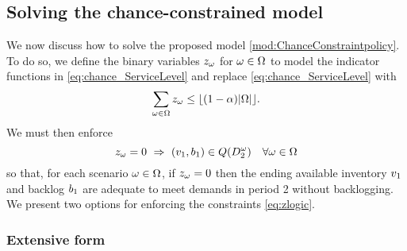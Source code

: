 \documentclass[msom]{oo}
\begin{document}
 
  
  \subsection{Solving the chance-constrained model}
  \label{ss:bnc}
  
  We now discuss how to solve the proposed model \eqref{mod:ChanceConstraintpolicy}.
To do so, we define the binary variables $z_\omega$ for $\omega \in \Omega$ to model the indicator functions in  \eqref{eq:chance_ServiceLevel} and replace \eqref{eq:chance_ServiceLevel} with
\begin{equation}
\label{eq:Child_Service}
\sum_{\omega \in \Omega} z_\omega \leq \lfloor (1-\alpha) |\Omega| \rfloor. 
\end{equation}
We must then enforce
\begin{equation}
\label{eq:zlogic}
z_\omega=0 \ \Rightarrow \ (v_1,b_1) \in Q(D_{2}^\omega) \quad \forall \omega \in \Omega
\end{equation}
so that, for each scenario $\omega \in \Omega$, if $z_\omega = 0$ then the ending  available inventory $v_1$ and backlog $b_1$ are adequate to meet demands in period 2 without backlogging.
We present two options for enforcing the constraints \eqref{eq:zlogic}. 

\subsubsection{Extensive form}
\label{sec:ext}
\end{document}
